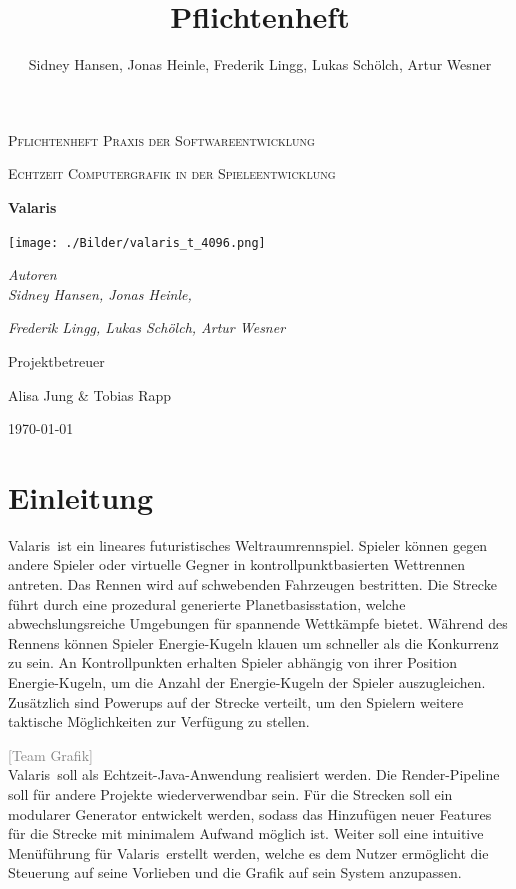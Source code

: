 \documentclass[parskip=full]{scrartcl}
\title{Pflichtenheft}
\author{Sidney Hansen, Jonas Heinle, Frederik Lingg, Lukas Schölch, Artur Wesner}
\newcommand{\codename}{Valaris}
\begin{document}
	\begin{titlepage}
		\centering
		{\scshape\LARGE Pflichtenheft Praxis der Softwareentwicklung\par}
		\vspace{1cm}
		{\scshape\Large Echtzeit Computergrafik in der Spieleentwicklung \par}
		\vspace{1cm}
		{\huge\bfseries \codename \par}
		\vspace{1cm}
		\texttt{[image: ./Bilder/valaris\_t\_4096.png]}
		\par
		{\vspace{1cm}}
		{\Large\itshape Autoren \\}
		{\Large\itshape Sidney Hansen, Jonas Heinle,\\}
		{\Large\itshape Frederik Lingg, Lukas Schölch, Artur Wesner\par}
		
		\vfill
		Projektbetreuer\par
		Alisa Jung \& Tobias Rapp
		
		\vfill
		
		{\large \today\par}
	\end{titlepage}

	\tableofcontents 
	
	\pagebreak
	
	\section{Einleitung}
	
	\codename\ ist ein lineares futuristisches Weltraumrennspiel. Spieler können gegen andere Spieler oder virtuelle Gegner in kontrollpunktbasierten Wettrennen antreten.
	Das Rennen wird auf schwebenden Fahrzeugen bestritten. Die Strecke führt durch eine prozedural generierte Planetbasisstation, welche abwechslungsreiche Umgebungen
	für spannende Wettkämpfe bietet. Während des Rennens können Spieler Energie-Kugeln klauen um schneller als die Konkurrenz zu sein. An Kontrollpunkten erhalten Spieler
	abhängig von ihrer Position Energie-Kugeln, um die Anzahl der Energie-Kugeln der Spieler auszugleichen. Zusätzlich sind Powerups auf der Strecke verteilt, um den Spielern
	weitere taktische Möglichkeiten zur Verfügung zu stellen. \par

	\textcolor{gray}{[Team Grafik]}\\
	\codename\ soll als Echtzeit-Java-Anwendung realisiert werden. Die Render-Pipeline soll für andere Projekte wiederverwendbar sein. Für die Strecken soll ein modularer
	Generator entwickelt werden, sodass das Hinzufügen neuer Features für die Strecke mit minimalem Aufwand möglich ist. Weiter soll eine intuitive Menüführung für
	\codename\ erstellt werden, welche es dem Nutzer ermöglicht die Steuerung auf seine Vorlieben und die Grafik auf sein System anzupassen. \par
\end{document}
